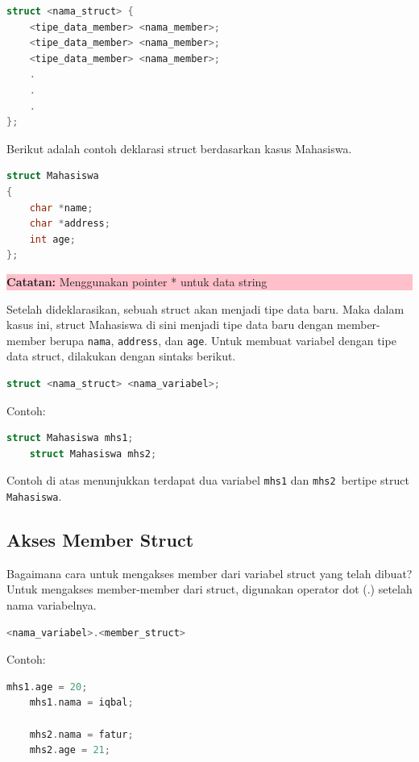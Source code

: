 \begin{lstlisting}[language=c]
struct <nama_struct> {
    <tipe_data_member> <nama_member>;
    <tipe_data_member> <nama_member>;
    <tipe_data_member> <nama_member>;
    .
    .
    .
};
\end{lstlisting}

Berikut adalah contoh deklarasi struct berdasarkan kasus Mahasiswa.
\begin{lstlisting}[language=c]
struct Mahasiswa
{
    char *name;
    char *address;
    int age;
};
\end{lstlisting}
\begin{center}
	\colorbox{pink}{\parbox{0.8\linewidth}{\textbf{Catatan:}  Menggunakan pointer * untuk data string}}
\end{center}

Setelah dideklarasikan, sebuah struct akan menjadi tipe data baru. 
Maka dalam kasus ini, struct Mahasiswa di sini menjadi tipe data baru dengan member-member berupa \verb|nama|, \verb|address|, dan \verb|age|. 
Untuk membuat variabel dengan tipe data struct, dilakukan dengan sintaks berikut.

\begin{lstlisting}[language=c]
    struct <nama_struct> <nama_variabel>;
\end{lstlisting}

Contoh:
\begin{lstlisting}[language=c]
    struct Mahasiswa mhs1;
    struct Mahasiswa mhs2;
\end{lstlisting}
Contoh di atas menunjukkan terdapat dua variabel \verb|mhs1| dan \verb|mhs2 |bertipe struct \verb|Mahasiswa|.

\subsection{Akses Member Struct}
Bagaimana cara untuk mengakses member dari variabel struct yang telah dibuat? \\
Untuk mengakses member-member dari struct, digunakan operator dot (.) setelah nama variabelnya.
\begin{lstlisting}[language=c]
    <nama_variabel>.<member_struct>
\end{lstlisting}

Contoh:
\begin{lstlisting}[language=c]
    mhs1.age = 20;
    mhs1.nama = iqbal;
    
    mhs2.nama = fatur;
    mhs2.age = 21;
\end{lstlisting}

